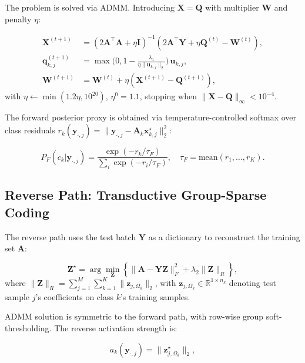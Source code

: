 \documentclass[10pt,comsoc]{IEEEtran}
\newcommand{\reals}{\mathbb{R}}
\begin{document}
The problem is solved via ADMM. Introducing $\mathbf{X}=\mathbf{Q}$ with multiplier $\mathbf{W}$ and penalty $\eta$:

\begin{equation}
\begin{aligned}
\mathbf{X}^{(t+1)} &= (2\mathbf{A}^\top\mathbf{A} + \eta\mathbf{I})^{-1}(2\mathbf{A}^\top\mathbf{Y} + \eta\mathbf{Q}^{(t)} - \mathbf{W}^{(t)}),\\
\mathbf{q}_{k,j}^{(t+1)} &= \max\!\big(0, 1 - \tfrac{\lambda_1}{\eta\|\mathbf{u}_{k,j}\|_2}\big)\,\mathbf{u}_{k,j},\\
\mathbf{W}^{(t+1)} &= \mathbf{W}^{(t)} + \eta(\mathbf{X}^{(t+1)} - \mathbf{Q}^{(t+1)}),
\end{aligned}
\end{equation}
with $\eta \leftarrow \min(1.2\eta, 10^{20})$, $\eta^0 = 1.1$, stopping when $\|\mathbf{X}-\mathbf{Q}\|_\infty < 10^{-4}$.

The forward posterior proxy is obtained via temperature-controlled softmax over class residuals $r_k(\mathbf{y}_{\cdot,j}) = \|\mathbf{y}_{\cdot,j} - \mathbf{A}_k\mathbf{x}_{k,j}^\star\|_2^2$:

\begin{equation}
P_F(c_k|\mathbf{y}_{\cdot,j}) = \frac{\exp(-r_k/\tau_F)}{\sum_i \exp(-r_i/\tau_F)},\quad \tau_F = \text{mean}(r_1,\dots,r_K).
\end{equation}

\subsection{Reverse Path: Transductive Group-Sparse Coding}

The reverse path uses the test batch $\mathbf{Y}$ as a dictionary to reconstruct the training set $\mathbf{A}$:

\begin{equation}
\label{eq:rv_opt}
\mathbf{Z}^\star = \arg\min_{\mathbf{Z}} \left\{ \|\mathbf{A} - \mathbf{YZ}\|_F^2 + \lambda_2 \|\mathbf{Z}\|_R \right\},
\end{equation}
where $\|\mathbf{Z}\|_R = \sum_{j=1}^M \sum_{k=1}^K \|\mathbf{z}_{j,\Omega_k}\|_2$, with $\mathbf{z}_{j,\Omega_k} \in \reals^{1 \times n_k}$ denoting test sample $j$'s coefficients on class $k$'s training samples.

ADMM solution is symmetric to the forward path, with row-wise group soft-thresholding. The reverse activation strength is:

\begin{equation}
a_k(\mathbf{y}_{\cdot,j}) = \|\mathbf{z}_{j,\Omega_k}^\star\|_2,
\end{equation}
\end{document}
